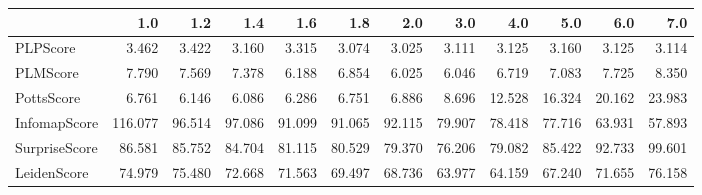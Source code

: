 \begin{tabular}{lrrrrrrrrrrr}
\toprule
{} &     1.0 &    1.2 &    1.4 &    1.6 &    1.8 &    2.0 &    3.0 &    4.0 &    5.0 &    6.0 &    7.0 \\
\midrule
PLPScore      &   3.462 &  3.422 &  3.160 &  3.315 &  3.074 &  3.025 &  3.111 &  3.125 &  3.160 &  3.125 &  3.114 \\
PLMScore      &   7.790 &  7.569 &  7.378 &  6.188 &  6.854 &  6.025 &  6.046 &  6.719 &  7.083 &  7.725 &  8.350 \\
PottsScore    &   6.761 &  6.146 &  6.086 &  6.286 &  6.751 &  6.886 &  8.696 & 12.528 & 16.324 & 20.162 & 23.983 \\
InfomapScore  & 116.077 & 96.514 & 97.086 & 91.099 & 91.065 & 92.115 & 79.907 & 78.418 & 77.716 & 63.931 & 57.893 \\
SurpriseScore &  86.581 & 85.752 & 84.704 & 81.115 & 80.529 & 79.370 & 76.206 & 79.082 & 85.422 & 92.733 & 99.601 \\
LeidenScore   &  74.979 & 75.480 & 72.668 & 71.563 & 69.497 & 68.736 & 63.977 & 64.159 & 67.240 & 71.655 & 76.158 \\
\bottomrule
\end{tabular}
